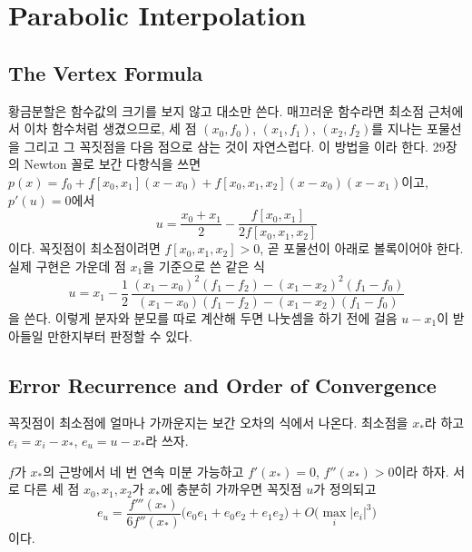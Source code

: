 \section{Parabolic Interpolation}
\label{sec:parabolic}

\subsection{The Vertex Formula}

황금분할은 함수값의 크기를 보지 않고 대소만 쓴다. 매끄러운 함수라면 최소점 근처에서 이차 함수처럼 생겼으므로, 세 점 $(x_0,f_0)$, $(x_1,f_1)$, $(x_2,f_2)$를 지나는 포물선을 그리고 그 꼭짓점을 다음 점으로 삼는 것이 자연스럽다. 이 방법을 이라 한다. 29장의 Newton 꼴로 보간 다항식을 쓰면 $p(x)=f_0+f[x_0,x_1](x-x_0)+f[x_0,x_1,x_2](x-x_0)(x-x_1)$이고, $p'(u)=0$에서
\[
u=\frac{x_0+x_1}2-\frac{f[x_0,x_1]}{2f[x_0,x_1,x_2]}
\]
이다. 꼭짓점이 최소점이려면 $f[x_0,x_1,x_2]>0$, 곧 포물선이 아래로 볼록이어야 한다. 실제 구현은 가운데 점 $x_1$을 기준으로 쓴 같은 식
\[
u=x_1-\frac12\,\frac{(x_1-x_0)^2(f_1-f_2)-(x_1-x_2)^2(f_1-f_0)}{(x_1-x_0)(f_1-f_2)-(x_1-x_2)(f_1-f_0)}
\]
을 쓴다. 이렇게 분자와 분모를 따로 계산해 두면 나눗셈을 하기 전에 걸음 $u-x_1$이 받아들일 만한지부터 판정할 수 있다.

\subsection{Error Recurrence and Order of Convergence}

꼭짓점이 최소점에 얼마나 가까운지는 보간 오차의 식에서 나온다. 최소점을 $x_\ast$라 하고 $e_i=x_i-x_\ast$, $e_u=u-x_\ast$라 쓰자.

\begin{theorem}
\label{thm:parabolic-error}
$f$가 $x_\ast$의 근방에서 네 번 연속 미분 가능하고 $f'(x_\ast)=0$, $f''(x_\ast)>0$이라 하자. 서로 다른 세 점 $x_0,x_1,x_2$가 $x_\ast$에 충분히 가까우면 꼭짓점 $u$가 정의되고
\[
e_u=\frac{f'''(x_\ast)}{6f''(x_\ast)}\bigl(e_0e_1+e_0e_2+e_1e_2\bigr)+O\bigl(\max_i|e_i|^3\bigr)
\]
이다.
\end{theorem}

